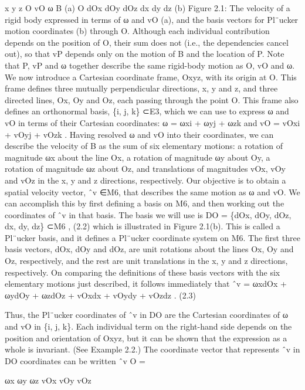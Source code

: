 x y z O vO ω B (a) O dOx dOy dOz dx dy dz (b) Figure 2.1: The velocity of a rigid body expressed in terms of ω and vO (a), and the basis vectors for Pl¨ucker motion coordinates (b) through O. Although each individual contribution depends on the position of O, their sum does not (i.e., the dependencies cancel out), so that vP depends only on the motion of B and the location of P. Note that P, vP and ω together describe the same rigid-body motion as O, vO and ω. We now introduce a Cartesian coordinate frame, Oxyz, with its origin at O. This frame defines three mutually perpendicular directions, x, y and z, and three directed lines, Ox, Oy and Oz, each passing through the point O. This frame also defines an orthonormal basis, \{i, j, k\} ⊂E3, which we can use to express ω and vO in terms of their Cartesian coordinates: ω = ωxi + ωyj + ωzk and vO = vOxi + vOyj + vOzk . Having resolved ω and vO into their coordinates, we can describe the velocity of B as the sum of six elementary motions: a rotation of magnitude ωx about the line Ox, a rotation of magnitude ωy about Oy, a rotation of magnitude ωz about Oz, and translations of magnitudes vOx, vOy and vOz in the x, y and z directions, respectively. Our objective is to obtain a spatial velocity vector, ˆv ∈M6, that describes the same motion as ω and vO. We can accomplish this by first defining a basis on M6, and then working out the coordinates of ˆv in that basis. The basis we will use is DO = \{dOx, dOy, dOz, dx, dy, dz\} ⊂M6 , (2.2) which is illustrated in Figure 2.1(b). This is called a Pl¨ucker basis, and it defines a Pl¨ucker coordinate system on M6. The first three basis vectors, dOx, dOy and dOz, are unit rotations about the lines Ox, Oy and Oz, respectively, and the rest are unit translations in the x, y and z directions, respectively. On comparing the definitions of these basis vectors with the six elementary motions just described, it follows immediately that ˆv = ωxdOx + ωydOy + ωzdOz + vOxdx + vOydy + vOzdz . (2.3)

Thus, the Pl¨ucker coordinates of ˆv in DO are the Cartesian coordinates of ω and vO in \{i, j, k\}. Each individual term on the right-hand side depends on the position and orientation of Oxyz, but it can be shown that the expression as a whole is invariant. (See Example 2.2.) The coordinate vector that represents ˆv in DO coordinates can be written ˆv O =

ωx ωy ωz vOx vOy vOz

